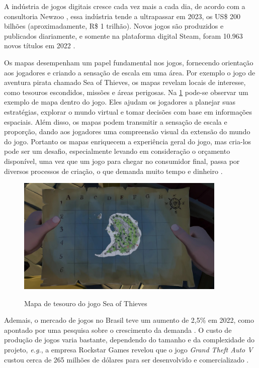 A indústria de jogos digitais cresce cada vez mais a cada dia, de acordo com a consultoria Newzoo \space\cite{quanto_games_vao_movimentar}, essa indústria tende a ultrapassar em 2023, os US\$ 200 bilhões (aproximadamente, R\$ 1 trilhão). Novos jogos são produzidos e publicados diariamente, e somente na plataforma digital Steam, foram 10.963 novos títulos em 2022\space
\cite{numero_de_jogos_publicados_na_steam}.

Os mapas desempenham um papel fundamental nos jogos, fornecendo orientação aos jogadores e criando a sensação de escala em uma área. Por exemplo o jogo de aventura pirata chamado Sea of Thieves, os mapas revelam locais de interesse, como tesouros escondidos, missões e áreas perigosas. Na \cref{fig:treasureMap} pode-se observar um exemplo de mapa dentro do jogo. Eles ajudam os jogadores a planejar suas estratégias, explorar o mundo virtual e tomar decisões com base em informações espaciais. Além disso, os mapas podem transmitir a sensação de escala e proporção, dando aos jogadores uma compreensão visual da extensão do mundo do jogo. Portanto os mapas enriquecem a experiência geral do jogo, mas cria-los pode ser um desafio, especialmente levando em consideração o orçamento disponível, uma vez que um jogo para chegar no consumidor final, passa por diversos processos de criação, o que demanda muito tempo e dinheiro \cite{video-game-maps, lecafedugeek}.

\begin{figure}[H]
	\caption{Mapa de tesouro do jogo Sea of Thieves}
	\centering %
	\includegraphics[width=10cm]{figures/Treasure_Map.jpg} %
	\label{fig:treasureMap}
\end{figure}

Ademais, o mercado de jogos no Brasil teve um aumento de 2,5\% em 2022, como apontado por uma pesquisa sobre o crescimento da demanda \cite{pesquisa_games_brasil}. O custo de produção de jogos varia bastante, dependendo do tamanho e da complexidade do projeto, \emph{e.g.}, a empresa Rockstar Games revelou que o jogo \textit{Grand Theft Auto V} custou cerca de 265 milhões de dólares para ser desenvolvido e comercializado \space
\cite{gta_quanto_custou}.

